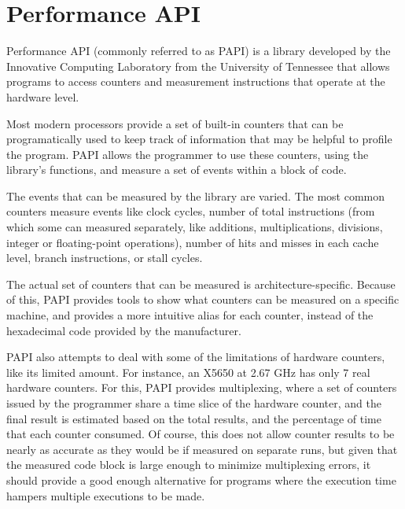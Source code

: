 \section{Performance API}
\label{sec:papi}


Performance API \cite{papi} (commonly referred to as PAPI) is a library developed by the Innovative Computing  Laboratory from the University of Tennessee that allows programs to access counters and measurement instructions that operate at the hardware level.

Most modern processors provide a set of built-in counters that can be programatically used to keep track of information that may be helpful to profile the program. PAPI allows the programmer to use these counters, using the library's functions, and measure a set of events within a block of code.

The events that can be measured by the library are varied. The most common counters measure events like clock cycles, number of total instructions (from which some can measured separately, like additions, multiplications, divisions, integer or floating-point operations), number of hits and misses in each cache level, branch instructions, or stall cycles.

The actual set of counters that can be measured is architecture-specific. Because of this, PAPI provides tools to show what counters can be measured on a specific machine, and provides a more intuitive alias for each counter, instead of the hexadecimal code provided by the manufacturer.

PAPI also attempts to deal with some of the limitations of hardware counters, like its limited amount. For instance, an \intel \xeon X5650 at 2.67 GHz has only 7 real hardware counters.
For this, PAPI provides multiplexing, where a set of counters issued by the programmer share a time slice of the hardware counter, and the final result is estimated based on the total results, and the percentage of time that each counter consumed. Of course, this does not allow counter results to be nearly as accurate as they would be if measured on separate runs, but given that the measured code block is large enough to minimize multiplexing errors, it should provide a good enough alternative for programs where the execution time hampers multiple executions to be made.
